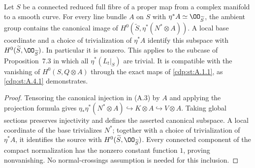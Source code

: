\begin{proposition}\label{cdp:st:A.5.1}
Let $S$ be a connected reduced full fibre of a proper map from a complex manifold to a smooth curve. For every line bundle $A$ on $S$ with $\eta^*A\simeq\OO_{\widetilde S}$, the ambient group contains the canonical image of $H^0(\widetilde S,\eta^*(N^*\otimes A))$. A local base coordinate and a choice of trivialization of $\eta^*A$ identify this subspace with $H^0(\widetilde S,\OO_{\widetilde S})$. In particular it is nonzero. This applies to the subcase of Proposition~7.3 in which all $\eta^*(L_t|_S)$ are trivial. It is compatible with the vanishing of $H^0(S,Q\otimes A)$ through the exact maps of \ref{cdp:st:A.1.1}, as \ref{cdp:st:A.4.1} demonstrates.
\end{proposition}

\begin{proof}
Tensoring the canonical injection in (A.3) by $A$ and applying the projection formula gives
$\eta_*\eta^*(N^*\otimes A)\hookrightarrow K\otimes A\hookrightarrow V\otimes A$.
Taking global sections preserves injectivity and defines the asserted canonical subspace. A local coordinate of the base trivializes $N^*$; together with a choice of trivialization of $\eta^*A$, it identifies the source with $H^0(\widetilde S,\OO_{\widetilde S})$. Every connected component of the compact normalization has the nonzero constant function $1$, proving nonvanishing. No normal-crossings assumption is needed for this inclusion.
\end{proof}
